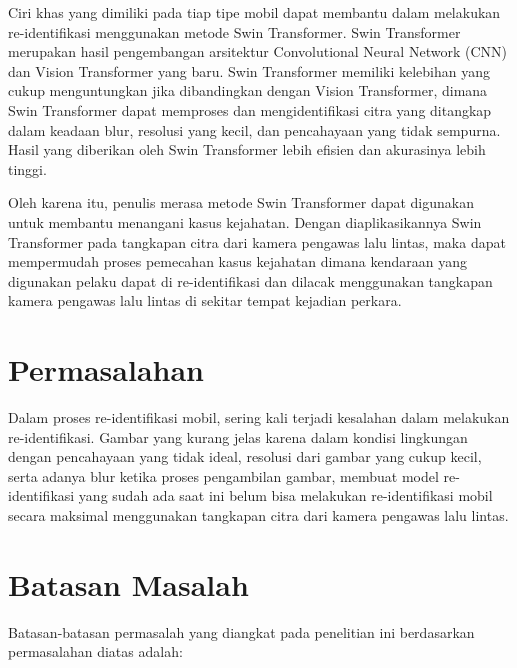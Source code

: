 Ciri khas yang dimiliki pada tiap tipe mobil dapat membantu dalam melakukan \linebreak
re-identifikasi menggunakan metode Swin Transformer. Swin Transformer merupakan hasil 
pengembangan arsitektur Convolutional Neural Network (CNN) dan Vision Transformer yang 
baru. Swin Transformer memiliki kelebihan yang cukup menguntungkan jika dibandingkan 
dengan Vision Transformer, dimana Swin Transformer dapat memproses dan mengidentifikasi 
citra yang ditangkap dalam keadaan blur, resolusi yang kecil, dan pencahayaan yang tidak 
sempurna. Hasil yang diberikan oleh Swin Transformer lebih efisien dan akurasinya lebih tinggi.

Oleh karena itu, penulis merasa metode Swin Transformer dapat digunakan untuk membantu menangani 
kasus kejahatan. Dengan diaplikasikannya Swin Transformer pada tangkapan citra dari kamera pengawas 
lalu lintas, maka dapat mempermudah proses pemecahan kasus kejahatan dimana kendaraan yang digunakan 
pelaku dapat di re-identifikasi dan dilacak menggunakan tangkapan kamera pengawas lalu lintas di 
sekitar tempat kejadian perkara.

\section{Permasalahan}
\label{sec:permasalahan}

Dalam proses re-identifikasi mobil, sering kali terjadi kesalahan dalam melakukan re-identifikasi.
Gambar yang kurang jelas karena dalam kondisi lingkungan dengan pencahayaan yang tidak ideal,
resolusi dari gambar yang cukup kecil, serta adanya blur ketika proses pengambilan gambar, membuat model re-identifikasi
yang sudah ada saat ini belum bisa melakukan re-identifikasi mobil secara maksimal menggunakan 
tangkapan citra dari kamera pengawas lalu lintas.

\section{Batasan Masalah}
\label{sec:batasanmasalah}

Batasan-batasan permasalah yang diangkat pada penelitian ini berdasarkan permasalahan diatas adalah:

